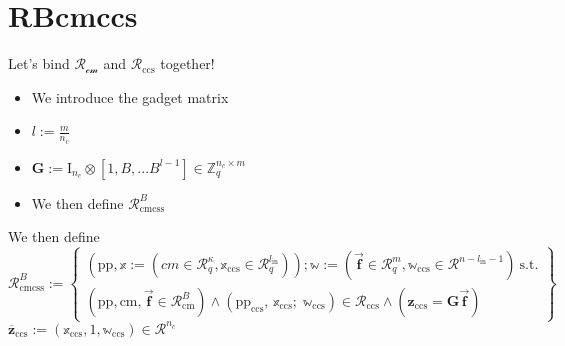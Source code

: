 \section{RBcmccs}
\begin{frame}
    {Let's bind $\mathcal{R_{\text{cm}}}$ and $\mathcal{R}_{\text{ccs}}$ together!}
    \begin{itemize}
        \item We introduce the gadget matrix
        \item $l := \frac{m}{n_c} $
        \item $\textbf{G} := \text{I}_{n_{c}}\otimes [1, B, ... B^{l -1}] \in \mathbb{Z}^{n_{c} \times m}_q$
        \item We then define $\mathcal{R}^{B}_{\text{cmcss}}$
    \end{itemize}
    We then define \begin{equation*}
        \mathcal{R}^{B}_{\text{cmcss}} := \left\{ \begin{array}{l}
            (\text{pp}, \mathbb{x} := (cm  \in \mathcal{R}^{\kappa}_q , \mathbb{x}_{\text{ccs}} \in \mathcal{R}^{l_{\text{in}}}_q));
            \mathbb{w} := (\overrightarrow{\textbf{f}} \in \mathcal{R}^m_q, \mathbb{w}_{\text{ccs}} \in \mathcal{R}^{n- l_{\text{in}} -1}) \ \text{s.t.} \\
            (\text{pp}, \text{cm}, \overrightarrow{\textbf{f}} \in \mathcal{R}^B_{\text{cm}}) \land (\text{pp}_\text{ccs},\,\mathbb{x}_\text{ccs};\;\mathbb{w}_\text{ccs}) \in \mathcal{R}_{\text{ccs}}\land (\textbf{z}_{\text{ccs}} = \textbf{G}\overrightarrow{\textbf{f}})
        \end{array} \right\}
    \end{equation*}
    $\overline{\textbf{z}}_{\text{ccs}}:= (\mathbb{x}_{\text{ccs}}, 1,\mathbb{w}_{\text{ccs}}) \in \mathcal{R}^{n_c}$
\end{frame}